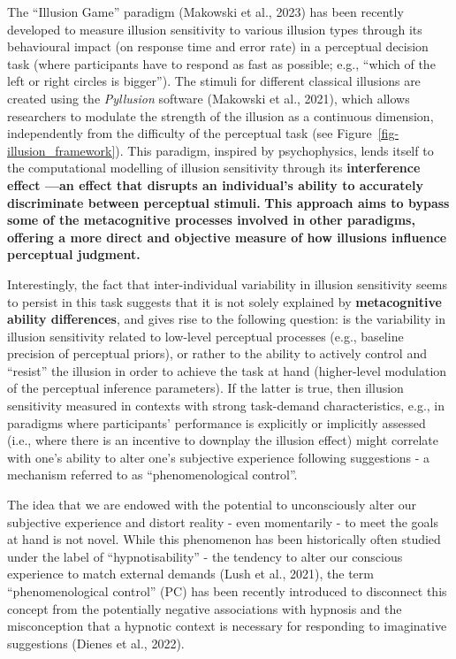\documentclass[
  man,
  floatsintext,
  longtable,
  nolmodern,
  notxfonts,
  notimes,
  colorlinks=true,linkcolor=blue,citecolor=blue,urlcolor=blue]{apa7}
\begin{document}
The ``Illusion Game'' paradigm (Makowski et al., 2023) has been recently
developed to measure illusion sensitivity to various illusion types
through its behavioural impact (on response time and error rate) in a
perceptual decision task (where participants have to respond as fast as
possible; e.g., ``which of the left or right circles is bigger''). The
stimuli for different classical illusions are created using the
\emph{Pyllusion} software (Makowski et al., 2021), which allows
researchers to modulate the strength of the illusion as a continuous
dimension, independently from the difficulty of the perceptual task (see
Figure~\ref{fig-illusion_framework}). This paradigm, inspired by
psychophysics, lends itself to the computational modelling of illusion
sensitivity through its \textbf{interference effect ---an effect that
disrupts an individual's ability to accurately discriminate between
perceptual stimuli.} \textbf{This approach aims to bypass some of the
metacognitive processes involved in other paradigms, offering a more
direct and objective measure of how illusions influence perceptual
judgment.}

Interestingly, the fact that inter-individual variability in illusion
sensitivity seems to persist in this task suggests that it is not solely
explained by \textbf{metacognitive ability differences}, and gives rise
to the following question: is the variability in illusion sensitivity
related to low-level perceptual processes (e.g., baseline precision of
perceptual priors), or rather to the ability to actively control and
``resist'' the illusion in order to achieve the task at hand
(higher-level modulation of the perceptual inference parameters). If the
latter is true, then illusion sensitivity measured in contexts with
strong task-demand characteristics, e.g., in paradigms where
participants' performance is explicitly or implicitly assessed (i.e.,
where there is an incentive to downplay the illusion effect) might
correlate with one's ability to alter one's subjective experience
following suggestions - a mechanism referred to as ``phenomenological
control''.

The idea that we are endowed with the potential to unconsciously alter
our subjective experience and distort reality - even momentarily - to
meet the goals at hand is not novel. While this phenomenon has been
historically often studied under the label of ``hypnotisability'' - the
tendency to alter our conscious experience to match external demands
(Lush et al., 2021), the term ``phenomenological control'' (PC) has been
recently introduced to disconnect this concept from the potentially
negative associations with hypnosis and the misconception that a
hypnotic context is necessary for responding to imaginative suggestions
(Dienes et al., 2022).
\end{document}
